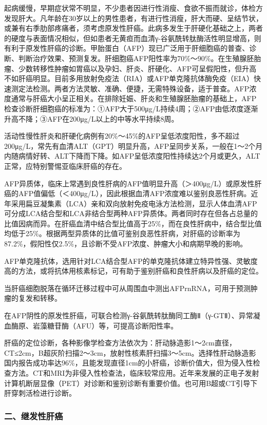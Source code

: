 起病缓慢，早期症状常不明显，不少患者因进行性消瘦、食欲不振而就诊，体检方发现肝大。凡年龄在30岁以上的男性患者，有进行性消瘦，肝大而硬、呈结节状，或兼有右季肋部疼痛者，须考虑原发性肝癌。此病多发生于肝硬化基础之上，两者的硬度与表面情况相似，但如患者无黄疸而血清γ-谷氨酰转肽酶活性明显增高，则有利于原发性肝癌的诊断。甲胎蛋白（AFP）现已广泛用于肝细胞癌的普查、诊断、判断治疗效果、预测复发。肝细胞癌AFP阳性率为70\%～90\%。在生殖腺胚胎瘤、少数转移性肿瘤如胃癌以及孕妇、肝炎、肝硬化、AFP可呈假阳性，但升高不如肝癌明显。目前多用放射免疫法（RIA）或AFP单克隆抗体酶免疫（EIA）快速测定法检测。两者方法灵敏、准确、便捷，无需特殊设备，适于普查。AFP浓度通常与肝癌大小呈正相关。在排除妊娠、肝炎和生殖腺胚胎瘤的基础上，AFP检查诊断肝细胞癌的标准为：①AFP大于500μg/L持续4周；②AFP由低浓度逐渐升高不降；③AFP在200μg/L以上的中等水平持续8周。

活动性慢性肝炎和肝硬化病例有20\%～45\%的AFP呈低浓度阳性，多不超过200μg/L，常先有血清ALT（GPT）明显升高，AFP呈同步关系，一般在1～2个月内随病情好转、ALT下降而下降。如AFP呈低浓度阳性持续达2个月或更久，ALT正常，应特别警惕亚临床肝癌的存在。

AFP异质体，临床上常遇到良性肝病的AFP值明显升高（＞400μg/L）或原发性肝癌的AFP值偏低（＜400μg/L），因此根据血清AFP浓度难以鉴别良恶性肝病。近年采用扁豆凝集素（LCA）亲和双向放射免疫电泳方法检测，显示人体血清AFP可分成LCA结合型和LCA非结合型两种AFP异质体。两者同时存在但各占总量的比值因病而异。在肝癌血清中结合型比值高于25\%，而在良性肝病中，结合型比值均低于25\%。根据两型异质体的比值可鉴别良恶性肝病，对肝癌的诊断率为87.2\%，假阳性仅2.5\%，且诊断不受AFP浓度、肿瘤大小和病期早晚的影响。

AFP单克隆抗体，选用针对LCA结合型AFP的单克隆抗体建立特异性强、灵敏度高的方法，或将抗体用核素标记，可有助于鉴别肝癌和良性肝病以及肝癌的定位。

当肝癌细胞脱落在循环迁移过程中可从周围血中测出AFPrnRNA，可用于预测肿瘤的复发和转移。

在AFP阴性的原发性肝癌，可联合检测γ-谷氨酰转肽酶同工酶Ⅱ（γ-GTⅡ）、异常凝血酶原、岩藻糖苷酶（AFU）等，可提高诊断阳性率。

肝癌的定位诊断，各种影像学检查方法依次为：肝动脉造影1～2cm直径，CT≤2cm，B超灰阶扫描2～3cm，放射性核素肝扫描3～5cm。选择性肝动脉造影国内报告成功率达96\%，且能发现直径1cm的小肝癌，诊断价值大，但为侵入性检查方法。CT和MRI为非侵入性检查法，临床较常应用。近年来发展的正电子发射计算机断层显像（PET）对诊断和鉴别诊断有重要价值。也可用B超或CT引导下肝穿刺活检进行诊断。

\subsubsection{二、继发性肝癌}

